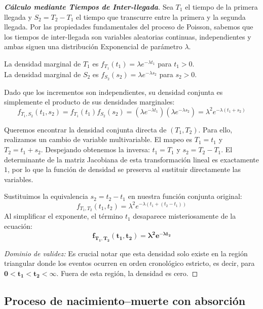 \documentclass[10pt,a4paper]{article}
\begin{document}
\begin{proof}[\textbf{Cálculo mediante Tiempos de Inter-llegada}]
    Sea $T_1$ el tiempo de la primera llegada y $S_2 = T_2 - T_1$ el tiempo que transcurre entre la primera y la segunda llegada. 
    Por las propiedades fundamentales del proceso de Poisson, sabemos que los tiempos de inter-llegada son variables aleatorias continuas, independientes y ambas siguen una distribución Exponencial de parámetro $\lambda$.
    
    La densidad marginal de $T_1$ es $f_{T_1}(t_1) = \lambda e^{-\lambda t_1}$ para $t_1 > 0$. \\
    La densidad marginal de $S_2$ es $f_{S_2}(s_2) = \lambda e^{-\lambda s_2}$ para $s_2 > 0$.
    
    Dado que los incrementos son independientes, su densidad conjunta es simplemente el producto de sus densidades marginales:
    \[ f_{T_1, S_2}(t_1, s_2) = f_{T_1}(t_1) f_{S_2}(s_2) = (\lambda e^{-\lambda t_1}) (\lambda e^{-\lambda s_2}) = \lambda^2 e^{-\lambda (t_1 + s_2)} \]
    
    Queremos encontrar la densidad conjunta directa de $(T_1, T_2)$. Para ello, realizamos un cambio de variable multivariable. 
    El mapeo es $T_1 = t_1$ y $T_2 = t_1 + s_2$. 
    Despejando obtenemos la inversa: $t_1 = T_1$ y $s_2 = T_2 - T_1$.
    El determinante de la matriz Jacobiana de esta transformación lineal es exactamente $1$, por lo que la función de densidad se preserva al sustituir directamente las variables.
    
    Sustituimos la equivalencia $s_2 = t_2 - t_1$ en nuestra función conjunta original:
    \[ f_{T_1, T_2}(t_1, t_2) = \lambda^2 e^{-\lambda (t_1 + (t_2 - t_1))} \]
    Al simplificar el exponente, el término $t_1$ desaparece misteriosamente de la ecuación:
    \[ \mathbf{f_{T_1, T_2}(t_1, t_2) = \lambda^2 e^{-\lambda t_2}} \]
    
    \textit{Dominio de validez:} Es crucial notar que esta densidad solo existe en la región triangular donde los eventos ocurren en orden cronológico estricto, es decir, para $\mathbf{0 < t_1 < t_2 < \infty}$. Fuera de esta región, la densidad es cero.
\end{proof}

\newpage

\subsection{Proceso de nacimiento–muerte con absorción}
\end{document}
